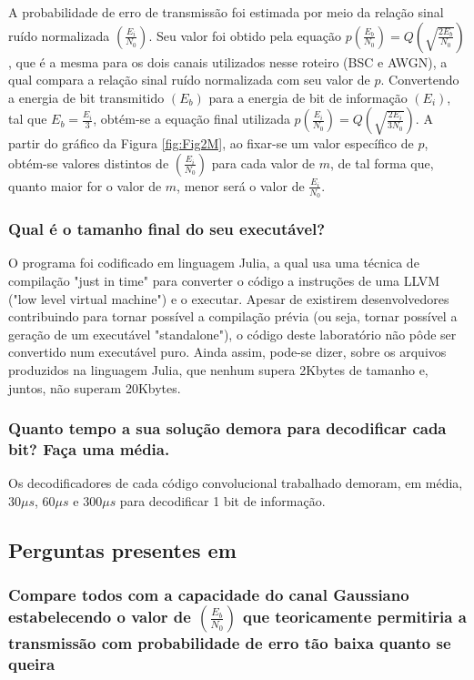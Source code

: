 A probabilidade de erro de transmissão foi estimada por meio da relação sinal ruído normalizada $(\frac{E_{i}}{N_{0}})$. Seu valor foi obtido pela equação $p(\frac{E_{b}}{N_{0}}) = Q(\sqrt{\frac{2E_{b}}{N_{0}}})$, que é a mesma para os dois canais utilizados nesse roteiro (BSC e AWGN), a qual compara a relação sinal ruído normalizada com seu valor de $p$. Convertendo a energia de bit transmitido $(E_{b})$ para a energia de bit de informação $(E_{i})$, tal que $E_{b} = \frac{E_{i}}{3}$, obtém-se a equação final utilizada $p(\frac{E_{i}}{N_{0}}) = Q(\sqrt{\frac{2E_{i}}{3N_{0}}})$. A partir do gráfico da Figura \ref{fig:Fig2M}, ao fixar-se um valor específico de $p$, obtém-se valores distintos de $(\frac{E_{i}}{N_{0}})$ para cada valor de $m$, de tal forma que, quanto maior for o valor de $m$, menor será o valor de $\frac{E_{i}}{N_{0}}$.  

\subsubsection{Qual é o tamanho final do seu executável?}

O programa foi codificado em linguagem Julia, a qual usa uma técnica de compilação "just in time" para converter o código a instruções de uma LLVM ("low level virtual machine") e o executar. Apesar de existirem desenvolvedores contribuindo para tornar possível a compilação prévia (ou seja, tornar possível a geração de um executável "standalone"), o código deste laboratório não pôde ser convertido num executável puro. Ainda assim, pode-se dizer, sobre os arquivos produzidos na linguagem Julia, que nenhum supera 2Kbytes de tamanho e, juntos, não superam 20Kbytes.

\subsubsection{Quanto tempo a sua solução demora para decodificar cada bit? Faça uma média.}

Os decodificadores de cada código convolucional trabalhado demoram, em média, $30 \mu s$, $60 \mu s$ e $300 \mu s$ para decodificar 1 bit de informação.

\subsection{Perguntas presentes em \cite{ref:roteiro4}}

\subsubsection{Compare todos com a capacidade do canal Gaussiano estabelecendo o valor de $(\frac{E_{b}}{N_{0}})$ que teoricamente permitiria a transmissão com probabilidade de erro tão baixa quanto se queira}

